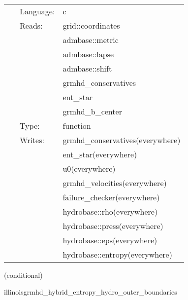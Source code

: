 \begin{tabular*}{160mm}{cll} 
~ & Language:  & c \\ 
~ & Reads:  & grid::coordinates \\ 
~& ~ &admbase::metric\\ 
~& ~ &admbase::lapse\\ 
~& ~ &admbase::shift\\ 
~& ~ &grmhd\_conservatives\\ 
~& ~ &ent\_star\\ 
~& ~ &grmhd\_b\_center\\ 
~ & Type:  & function \\ 
~ & Writes:  & grmhd\_conservatives(everywhere) \\ 
~& ~ &ent\_star(everywhere)\\ 
~& ~ &u0(everywhere)\\ 
~& ~ &grmhd\_velocities(everywhere)\\ 
~& ~ &failure\_checker(everywhere)\\ 
~& ~ &hydrobase::rho(everywhere)\\ 
~& ~ &hydrobase::press(everywhere)\\ 
~& ~ &hydrobase::eps(everywhere)\\ 
~& ~ &hydrobase::entropy(everywhere)\\ 
\end{tabular*} 


\vspace{5mm}

   (conditional) 

\hspace{5mm} illinoisgrmhd\_hybrid\_entropy\_hydro\_outer\_boundaries 

\hspace{5mm}{\it entropy+hybrid version of illinoisgrmhd\_hydro\_outer\_boundaries } 


\hspace{5mm}

